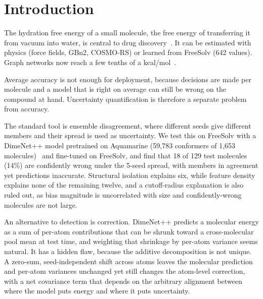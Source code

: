 \documentclass{article}
\begin{document}
\section{Introduction}

The hydration free energy of a small molecule, the free energy of
transferring it from vacuum into water, is central to drug discovery~\cite{mobley2014freesolv}.
It can be estimated with physics (force fields, GBn2, COSMO-RS) or learned
from FreeSolv (642 values). Graph networks now reach a few tenths of a kcal/mol~\cite{zhang2022}.

Average accuracy is not enough for deployment, because decisions are made per
molecule and a model that is right on average can still be wrong on the
compound at hand. Uncertainty quantification is therefore a separate problem
from accuracy.

The standard tool is ensemble disagreement, where different seeds give
different members and their spread is used as uncertainty. We test this on
FreeSolv with a DimeNet++ model pretrained on Aquamarine (59{,}783
conformers of 1{,}653 molecules)~\cite{medranosandonas2024aquamarine} and
fine-tuned on FreeSolv, and find that 18 of 129 test molecules (14\%) are
confidently wrong under the 5-seed spread, with members in agreement yet
predictions inaccurate. Structural isolation explains six, while feature density
explains none of the remaining twelve, and a cutoff-radius explanation is also
ruled out, as bias magnitude is uncorrelated with size and confidently-wrong
molecules are not large.

An alternative to detection is correction. DimeNet++ predicts a molecular
energy as a sum of per-atom contributions that can be shrunk toward a
cross-molecular pool mean at test time, and weighting that shrinkage by
per-atom variance seems natural. It has a hidden flaw, because the additive
decomposition is not unique. A zero-sum, seed-independent shift across atoms
leaves the molecular prediction and per-atom variances unchanged yet still
changes the atom-level correction, with a net covariance term that depends on
the arbitrary alignment between where the model puts energy and where it puts
uncertainty.
\end{document}
